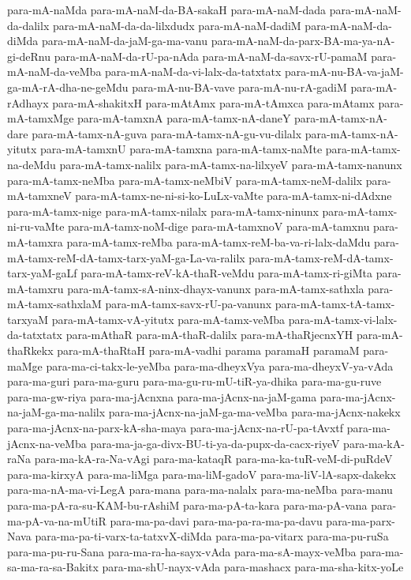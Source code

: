 {para-mA-naMda
para-mA-naM-da-BA-sakaH
para-mA-naM-dada
para-mA-naM-da-dalilx
para-mA-naM-da-da-lilxdudx
para-mA-naM-dadiM
para-mA-naM-da-diMda
para-mA-naM-da-jaM-ga-ma-vanu
para-mA-naM-da-parx-BA-ma-ya-nA-gi-deRnu
para-mA-naM-da-rU-pa-nAda
para-mA-naM-da-savx-rU-pamaM
para-mA-naM-da-veMba
para-mA-naM-da-vi-lalx-da-tatxtatx
para-mA-nu-BA-va-jaM-ga-mA-rA-dha-ne-geMdu
para-mA-nu-BA-vave
para-mA-nu-rA-gadiM
para-mA-rAdhayx
para-mA-shakitxH
para-mAtAmx
para-mA-tAmxca
para-mAtamx
para-mA-tamxMge
para-mA-tamxnA
para-mA-tamx-nA-daneY
para-mA-tamx-nA-dare
para-mA-tamx-nA-guva
para-mA-tamx-nA-gu-vu-dilalx
para-mA-tamx-nA-yitutx
para-mA-tamxnU
para-mA-tamxna
para-mA-tamx-naMte
para-mA-tamx-na-deMdu
para-mA-tamx-nalilx
para-mA-tamx-na-lilxyeV
para-mA-tamx-nanunx
para-mA-tamx-neMba
para-mA-tamx-neMbiV
para-mA-tamx-neM-dalilx
para-mA-tamxneV
para-mA-tamx-ne-ni-si-ko-LuLx-vaMte
para-mA-tamx-ni-dAdxne
para-mA-tamx-nige
para-mA-tamx-nilalx
para-mA-tamx-ninunx
para-mA-tamx-ni-ru-vaMte
para-mA-tamx-noM-dige
para-mA-tamxnoV
para-mA-tamxnu
para-mA-tamxra
para-mA-tamx-reMba
para-mA-tamx-reM-ba-va-ri-lalx-daMdu
para-mA-tamx-reM-dA-tamx-tarx-yaM-ga-La-va-ralilx
para-mA-tamx-reM-dA-tamx-tarx-yaM-gaLf
para-mA-tamx-reV-kA-thaR-veMdu
para-mA-tamx-ri-giMta
para-mA-tamxru
para-mA-tamx-sA-ninx-dhayx-vanunx
para-mA-tamx-sathxla
para-mA-tamx-sathxlaM
para-mA-tamx-savx-rU-pa-vanunx
para-mA-tamx-tA-tamx-tarxyaM
para-mA-tamx-vA-yitutx
para-mA-tamx-veMba
para-mA-tamx-vi-lalx-da-tatxtatx
para-mAthaR
para-mA-thaR-dalilx
para-mA-thaRjecnxYH
para-mA-thaRkekx
para-mA-thaRtaH
para-mA-vadhi
parama
paramaH
paramaM
para-maMge
para-ma-ci-takx-le-yeMba
para-ma-dheyxVya
para-ma-dheyxV-ya-vAda
para-ma-guri
para-ma-guru
para-ma-gu-ru-mU-tiR-ya-dhika
para-ma-gu-ruve
para-ma-gw-riya
para-ma-jAcnxna
para-ma-jAcnx-na-jaM-gama
para-ma-jAcnx-na-jaM-ga-ma-nalilx
para-ma-jAcnx-na-jaM-ga-ma-veMba
para-ma-jAcnx-nakekx
para-ma-jAcnx-na-parx-kA-sha-maya
para-ma-jAcnx-na-rU-pa-tAvxtf
para-ma-jAcnx-na-veMba
para-ma-ja-ga-divx-BU-ti-ya-da-pupx-da-cacx-riyeV
para-ma-kA-raNa
para-ma-kA-ra-Na-vAgi
para-ma-kataqR
para-ma-ka-tuR-veM-di-puRdeV
para-ma-kirxyA
para-ma-liMga
para-ma-liM-gadoV
para-ma-liV-lA-sapx-dakekx
para-ma-nA-ma-vi-LegA
para-mana
para-ma-nalalx
para-ma-neMba
para-manu
para-ma-pA-ra-su-KAM-bu-rAshiM
para-ma-pA-ta-kara
para-ma-pA-vana
para-ma-pA-va-na-mUtiR
para-ma-pa-davi
para-ma-pa-ra-ma-pa-davu
para-ma-parx-Nava
para-ma-pa-ti-varx-ta-tatxvX-diMda
para-ma-pa-vitarx
para-ma-pu-ruSa
para-ma-pu-ru-Sana
para-ma-ra-ha-sayx-vAda
para-ma-sA-mayx-veMba
para-ma-sa-ma-ra-sa-Bakitx
para-ma-shU-nayx-vAda
para-mashacx
para-ma-sha-kitx-yoLe
}
